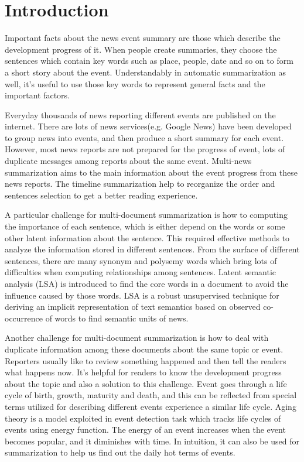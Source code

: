 \documentclass[print]{jicspack}
\begin{document}
\section{Introduction}
\label{Introduction}
Important facts about the news event summary are those which describe the development progress of it.
When people create summaries, they choose the sentences which contain key words such as place, people, date and so on to form a short story about the event.
Understandably in automatic summarization as well, it's useful to use those key words to represent general facts and the important factors.

Everyday thousands of news reporting different events are published on the internet. 
There are lots of news services(e.g. Google News) have been developed to group news into events, and then produce a short summary for each event.
However, most news reports are not prepared for the progress of event, lots of duplicate messages among reports about the same event. 
Multi-news summarization aims to the main information about the event progress from these news reports.
The timeline summarization help to reorganize the order and sentences selection to get a better reading experience.

A particular challenge for multi-document summarization is how to computing the importance of each sentence, which is either depend on the words or some other latent information about the sentence.
This required effective methods to analyze the information stored in different sentences.
From the surface of different sentences, there are many synonym and polysemy words which bring lots of difficulties when computing relationships among sentences.
Latent semantic analysis (LSA) \cite{1990-Deerwester-p391-407} is introduced to find the core words in a document to avoid the influence caused by those words.
LSA is a robust unsupervised technique for deriving an implicit representation of text semantics based on observed co-occurrence of words to find semantic units of news.


Another challenge for multi-document summarization is how to deal with duplicate information among these documents about the same topic or event.
Reporters usually like to review something happened and then tell the readers what happens now. 
It's helpful for readers to know the development progress about the topic and also a solution to this challenge.
Event goes through a life cycle of birth, growth, maturity and death, and this can be reflected from special terms utilized for describing different events experience a similar life cycle. 
Aging theory \cite{chen2003life} is a model exploited in event detection task which tracks life cycles of events using energy function. 
The energy of an event increases when the event becomes popular, and it diminishes with time. 
In intuition, it can also be used for summarization to help us find out the daily hot terms of events. 
\end{document}
